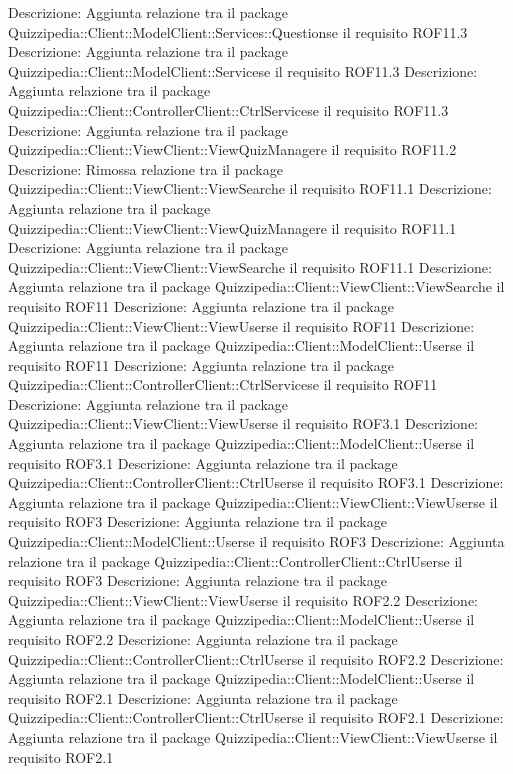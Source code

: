Descrizione: Aggiunta relazione tra il package Quizzipedia::Client::ModelClient::Services::Questionse il requisito ROF11.3 
Descrizione: Aggiunta relazione tra il package Quizzipedia::Client::ModelClient::Servicese il requisito ROF11.3 
Descrizione: Aggiunta relazione tra il package Quizzipedia::Client::ControllerClient::CtrlServicese il requisito ROF11.3 
Descrizione: Aggiunta relazione tra il package Quizzipedia::Client::ViewClient::ViewQuizManagere il requisito ROF11.2 
Descrizione: Rimossa relazione tra il package Quizzipedia::Client::ViewClient::ViewSearche il requisito ROF11.1 
Descrizione: Aggiunta relazione tra il package Quizzipedia::Client::ViewClient::ViewQuizManagere il requisito ROF11.1 
Descrizione: Aggiunta relazione tra il package Quizzipedia::Client::ViewClient::ViewSearche il requisito ROF11.1 
Descrizione: Aggiunta relazione tra il package Quizzipedia::Client::ViewClient::ViewSearche il requisito ROF11 
Descrizione: Aggiunta relazione tra il package Quizzipedia::Client::ViewClient::ViewUserse il requisito ROF11 
Descrizione: Aggiunta relazione tra il package Quizzipedia::Client::ModelClient::Userse il requisito ROF11 
Descrizione: Aggiunta relazione tra il package Quizzipedia::Client::ControllerClient::CtrlServicese il requisito ROF11 
Descrizione: Aggiunta relazione tra il package Quizzipedia::Client::ViewClient::ViewUserse il requisito ROF3.1 
Descrizione: Aggiunta relazione tra il package Quizzipedia::Client::ModelClient::Userse il requisito ROF3.1 
Descrizione: Aggiunta relazione tra il package Quizzipedia::Client::ControllerClient::CtrlUserse il requisito ROF3.1 
Descrizione: Aggiunta relazione tra il package Quizzipedia::Client::ViewClient::ViewUserse il requisito ROF3 
Descrizione: Aggiunta relazione tra il package Quizzipedia::Client::ModelClient::Userse il requisito ROF3 
Descrizione: Aggiunta relazione tra il package Quizzipedia::Client::ControllerClient::CtrlUserse il requisito ROF3 
Descrizione: Aggiunta relazione tra il package Quizzipedia::Client::ViewClient::ViewUserse il requisito ROF2.2 
Descrizione: Aggiunta relazione tra il package Quizzipedia::Client::ModelClient::Userse il requisito ROF2.2 
Descrizione: Aggiunta relazione tra il package Quizzipedia::Client::ControllerClient::CtrlUserse il requisito ROF2.2 
Descrizione: Aggiunta relazione tra il package Quizzipedia::Client::ModelClient::Userse il requisito ROF2.1 
Descrizione: Aggiunta relazione tra il package Quizzipedia::Client::ControllerClient::CtrlUserse il requisito ROF2.1 
Descrizione: Aggiunta relazione tra il package Quizzipedia::Client::ViewClient::ViewUserse il requisito ROF2.1 
